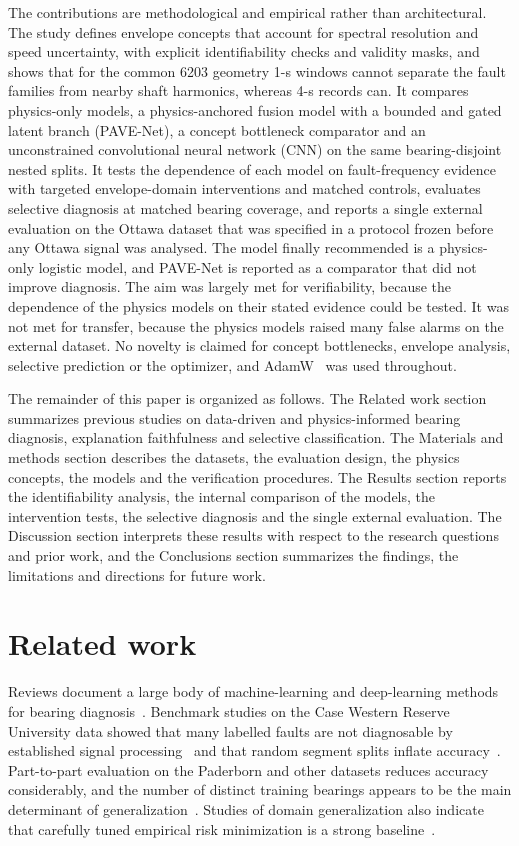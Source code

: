 \documentclass[10pt,letterpaper]{article}
\begin{document}
The contributions are methodological and empirical rather than architectural. The study defines envelope concepts that account for spectral resolution and speed uncertainty, with explicit identifiability checks and validity masks, and shows that for the common 6203 geometry 1-s windows cannot separate the fault families from nearby shaft harmonics, whereas 4-s records can. It compares physics-only models, a physics-anchored fusion model with a bounded and gated latent branch (PAVE-Net), a concept bottleneck comparator and an unconstrained convolutional neural network (CNN) on the same bearing-disjoint nested splits. It tests the dependence of each model on fault-frequency evidence with targeted envelope-domain interventions and matched controls, evaluates selective diagnosis at matched bearing coverage, and reports a single external evaluation on the Ottawa dataset that was specified in a protocol frozen before any Ottawa signal was analysed. The model finally recommended is a physics-only logistic model, and PAVE-Net is reported as a comparator that did not improve diagnosis. The aim was largely met for verifiability, because the dependence of the physics models on their stated evidence could be tested. It was not met for transfer, because the physics models raised many false alarms on the external dataset. No novelty is claimed for concept bottlenecks, envelope analysis, selective prediction or the optimizer, and AdamW~\cite{loshchilov2019decoupled} was used throughout.

The remainder of this paper is organized as follows. The Related work section summarizes previous studies on data-driven and physics-informed bearing diagnosis, explanation faithfulness and selective classification. The Materials and methods section describes the datasets, the evaluation design, the physics concepts, the models and the verification procedures. The Results section reports the identifiability analysis, the internal comparison of the models, the intervention tests, the selective diagnosis and the single external evaluation. The Discussion section interprets these results with respect to the research questions and prior work, and the Conclusions section summarizes the findings, the limitations and directions for future work.

\section*{Related work}
Reviews document a large body of machine-learning and deep-learning methods for bearing diagnosis~\cite{zhang2020deep,lei2020applications}. Benchmark studies on the Case Western Reserve University data showed that many labelled faults are not diagnosable by established signal processing~\cite{smith2015rolling} and that random segment splits inflate accuracy~\cite{hendriks2022towards}. Part-to-part evaluation on the Paderborn and other datasets reduces accuracy considerably, and the number of distinct training bearings appears to be the main determinant of generalization~\cite{wheat2024impact,vieira2026towards}. Studies of domain generalization also indicate that carefully tuned empirical risk minimization is a strong baseline~\cite{gulrajani2021search}.
\end{document}

